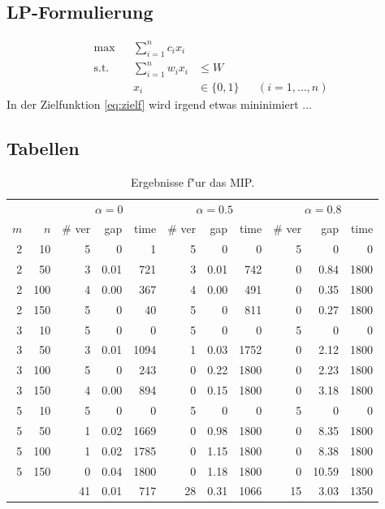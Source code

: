 \subsection{LP-Formulierung}
\label{subsec:lp}

\begin{align}
\max 	&& \sum_{i = 1}^n c_i x_i \label{eq:zielf}\\
\text{s.t.} && \sum_{i = 1}^n w_i x_i &\leq W&& \label{eq:c1}\\
	&& x_i & \in \{0, 1\} && (i = 1, \ldots, n)
\end{align}
In der Zielfunktion \eqref{eq:zielf} wird irgend etwas mininimiert ...



\subsection{Tabellen}

\begin{table}[!htbp] \centering
\small
\begin{tabular}{|r|r||r|r|r||r|r|r||r|r|r||} \hline
& & \multicolumn{3}{c||}{$\alpha=0$} & \multicolumn{3}{c||}{$\alpha=0.5$} & \multicolumn{3}{c||}{$\alpha=0.8$}\\
$m$ & $n$ & \# ver & gap & time &  \# ver & gap & time &  \# ver & gap & time  \\  \hline
2 & 10   & 5  & 0	& 1	& 5 & 0   	& 0	& 5 &0		& 0\\
2 & 50   & 3  & 0.01	& 721	& 3 & 0.01	& 742	& 0 &0.84	& 1800\\
2 & 100  & 4  & 0.00	& 367	& 4 & 0.00	& 491	& 0 &0.35	& 1800\\
2 & 150  & 5  & 0	& 40	& 5 & 0		& 811	& 0 &0.27	& 1800\\
3 & 10   & 5  & 0	& 0	& 5 & 0		& 0	& 5 &0 		& 0\\
3 & 50   & 3  & 0.01	& 1094	& 1 & 0.03	& 1752	& 0 &2.12	& 1800\\
3 & 100  & 5  & 0	& 243	& 0 & 0.22	& 1800	& 0 &2.23	& 1800\\
3 & 150  & 4  & 0.00	& 894	& 0 & 0.15	& 1800	& 0 &3.18	& 1800 \\
5 & 10   & 5  & 0	& 0	& 5 & 0 	& 0	& 5 &0 		& 0 \\
5 & 50   & 1  & 0.02	& 1669	& 0 & 0.98	& 1800	& 0 &8.35 	& 1800\\
5 & 100  & 1  & 0.02	& 1785	& 0 & 1.15	& 1800	& 0 &8.38 	& 1800 \\
5 & 150  & 0  & 0.04	& 1800	& 0 & 1.18	& 1800	& 0 &10.59 	& 1800 \\ \hline
\multicolumn{2}{l||}{\ }  &
           41  &0.01	& 717	&28 & 0.31	& 1066	& 15 &3.03 	& 1350
\end{tabular}
\caption{Ergebnisse f"ur das MIP.}
    \label{tab:mip_lb}
\end{table}


